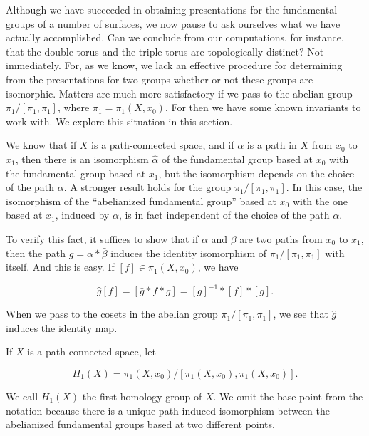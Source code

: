Although we have succeeded in obtaining presentations for the fundamental groups of a number of surfaces, we now pause to ask ourselves what we have actually accomplished. Can we conclude from our computations, for instance, that the double torus and the triple torus are topologically distinct? Not immediately. For, as we know, we lack an effective procedure for determining from the presentations for two groups whether or not these groups are isomorphic. Matters are much more satisfactory if we pass to the abelian group \({\pi }_{1}/[ {{\pi }_{1},{\pi }_{1}}]\), where \({\pi }_{1} = {\pi }_{1}( {X,x_{0}})\). For then we have some known invariants to work with. We explore this situation in this section.

We know that if \(X\) is a path-connected space, and if \(\alpha\) is a path in \(X\) from \(x_{0}\) to \(x_{1}\), then there is an isomorphism \(\hat{\alpha }\) of the fundamental group based at \(x_{0}\) with the fundamental group based at \(x_{1}\), but the isomorphism depends on the choice of the path \(\alpha\). A stronger result holds for the group \({\pi }_{1}/[ {{\pi }_{1},{\pi }_{1}}]\). In this case, the isomorphism of the ``abelianized fundamental group'' based at \(x_{0}\) with the one based at \(x_{1}\), induced by \(\alpha\), is in fact independent of the choice of the path \(\alpha\).

To verify this fact, it suffices to show that if \(\alpha\) and \(\beta\) are two paths from \(x_{0}\) to \(x_{1}\), then the path \(g = \alpha * \bar{\beta }\) induces the identity isomorphism of \({\pi }_{1}/[ {{\pi }_{1},{\pi }_{1}}]\) with itself. And this is easy. If \([ f] \in {\pi }_{1}( {X,x_{0}})\), we have

\[
\hat{g}[ f] = [ {\bar{g} * f * g}] = {[ g] }^{-1} * [ f] * [ g] .
\]

When we pass to the cosets in the abelian group \({\pi }_{1}/[ {{\pi }_{1},{\pi }_{1}}]\), we see that \(\hat{g}\) induces the identity map.

\begin{definition}
	If \(X\) is a path-connected space, let

\[
H_{1}( X) = {\pi }_{1}( {X,x_{0}}) /[ {{\pi }_{1}( {X,x_{0}}),{\pi }_{1}( {X,x_{0}}) }] .
\]
\end{definition}

We call \(H_{1}( X)\) the first homology group of \(X\). We omit the base point from the notation because there is a unique path-induced isomorphism between the abelianized fundamental groups based at two different points.


